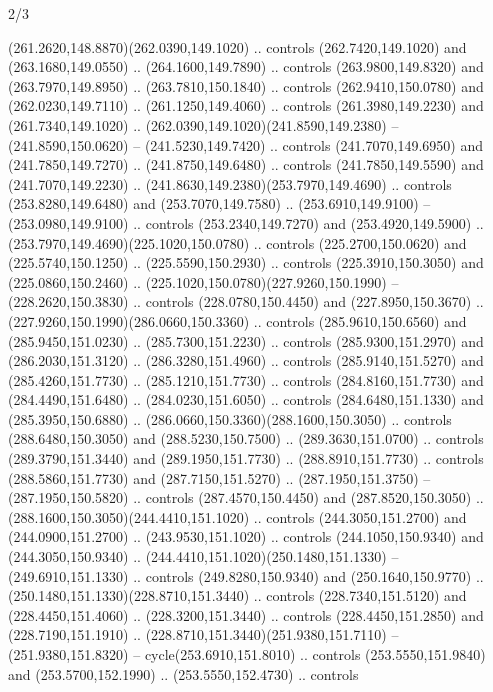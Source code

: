 \begin{flagdescription}{2/3}
\begin{scope}[xshift=0.5\flaglength,yshift=0.5\flagwidth,scale=\flagwidth/259.2]
\begin{scope}[y=0.8pt, x=0.8pt, yscale=-1,shift={(-243,-162)}]
      (261.2620,148.8870)(262.0390,149.1020) .. controls (262.7420,149.1020) and
      (263.1680,149.0550) .. (264.1600,149.7890) .. controls (263.9800,149.8320) and
      (263.7970,149.8950) .. (263.7810,150.1840) .. controls (262.9410,150.0780) and
      (262.0230,149.7110) .. (261.1250,149.4060) .. controls (261.3980,149.2230) and
      (261.7340,149.1020) .. (262.0390,149.1020)(241.8590,149.2380) --
      (241.8590,150.0620) -- (241.5230,149.7420) .. controls (241.7070,149.6950) and
      (241.7850,149.7270) .. (241.8750,149.6480) .. controls (241.7850,149.5590) and
      (241.7070,149.2230) .. (241.8630,149.2380)(253.7970,149.4690) .. controls
      (253.8280,149.6480) and (253.7070,149.7580) .. (253.6910,149.9100) --
      (253.0980,149.9100) .. controls (253.2340,149.7270) and (253.4920,149.5900) ..
      (253.7970,149.4690)(225.1020,150.0780) .. controls (225.2700,150.0620) and
      (225.5740,150.1250) .. (225.5590,150.2930) .. controls (225.3910,150.3050) and
      (225.0860,150.2460) .. (225.1020,150.0780)(227.9260,150.1990) --
      (228.2620,150.3830) .. controls (228.0780,150.4450) and (227.8950,150.3670) ..
      (227.9260,150.1990)(286.0660,150.3360) .. controls (285.9610,150.6560) and
      (285.9450,151.0230) .. (285.7300,151.2230) .. controls (285.9300,151.2970) and
      (286.2030,151.3120) .. (286.3280,151.4960) .. controls (285.9140,151.5270) and
      (285.4260,151.7730) .. (285.1210,151.7730) .. controls (284.8160,151.7730) and
      (284.4490,151.6480) .. (284.0230,151.6050) .. controls (284.6480,151.1330) and
      (285.3950,150.6880) .. (286.0660,150.3360)(288.1600,150.3050) .. controls
      (288.6480,150.3050) and (288.5230,150.7500) .. (289.3630,151.0700) .. controls
      (289.3790,151.3440) and (289.1950,151.7730) .. (288.8910,151.7730) .. controls
      (288.5860,151.7730) and (287.7150,151.5270) .. (287.1950,151.3750) --
      (287.1950,150.5820) .. controls (287.4570,150.4450) and (287.8520,150.3050) ..
      (288.1600,150.3050)(244.4410,151.1020) .. controls (244.3050,151.2700) and
      (244.0900,151.2700) .. (243.9530,151.1020) .. controls (244.1050,150.9340) and
      (244.3050,150.9340) .. (244.4410,151.1020)(250.1480,151.1330) --
      (249.6910,151.1330) .. controls (249.8280,150.9340) and (250.1640,150.9770) ..
      (250.1480,151.1330)(228.8710,151.3440) .. controls (228.7340,151.5120) and
      (228.4450,151.4060) .. (228.3200,151.3440) .. controls (228.4450,151.2850) and
      (228.7190,151.1910) .. (228.8710,151.3440)(251.9380,151.7110) --
      (251.9380,151.8320) -- cycle(253.6910,151.8010) .. controls
      (253.5550,151.9840) and (253.5700,152.1990) .. (253.5550,152.4730) .. controls

\end{scope}
\end{scope}
\end{flagdescription}
